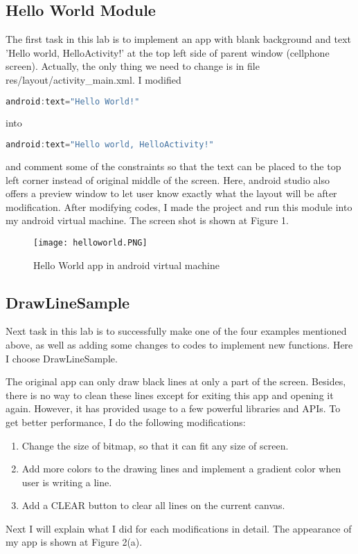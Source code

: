\documentclass{article}
\begin{document}
\subsection{Hello World Module}
The first task in this lab is to implement an app with blank background and text 'Hello world, HelloActivity!' at the top left side of parent window (cellphone screen). Actually, the only thing we need to change is in file res/layout/activity\_main.xml. I modified
\begin{lstlisting}[language=Java]
    android:text="Hello World!"
\end{lstlisting}
into
\begin{lstlisting}[language=Java]
    android:text="Hello world, HelloActivity!"
\end{lstlisting}
and comment some of the constraints so that the text can be placed to the top left corner instead of original middle of the screen. Here, android studio also offers a preview window to let user know exactly what the layout will be after modification. After modifying codes, I made the project and run this module into my android virtual machine. The screen shot is shown at Figure 1.
\begin{figure}
    \centering
    \texttt{[image: helloworld.PNG]}
    \caption{Hello World app in android virtual machine}
\end{figure}

\subsection{DrawLineSample}
Next task in this lab is to successfully make one of the four examples mentioned above, as well as adding some changes to codes to implement new functions. Here I choose DrawLineSample. 

The original app can only draw black lines at only a part of the screen. Besides, there is no way to clean these lines except for exiting this app and opening it again. However, it has provided usage to a few powerful libraries and APIs. To get better performance, I do the following modifications:
\begin{enumerate}
    \item Change the size of bitmap, so that it can fit any size of screen.
    \item Add more colors to the drawing lines and implement a gradient color when user is writing a line.
    \item Add a CLEAR button to clear all lines on the current canvas.
\end{enumerate}
Next I will explain what I did for each modifications in detail. The appearance of my app is shown at Figure 2(a).
\end{document}
